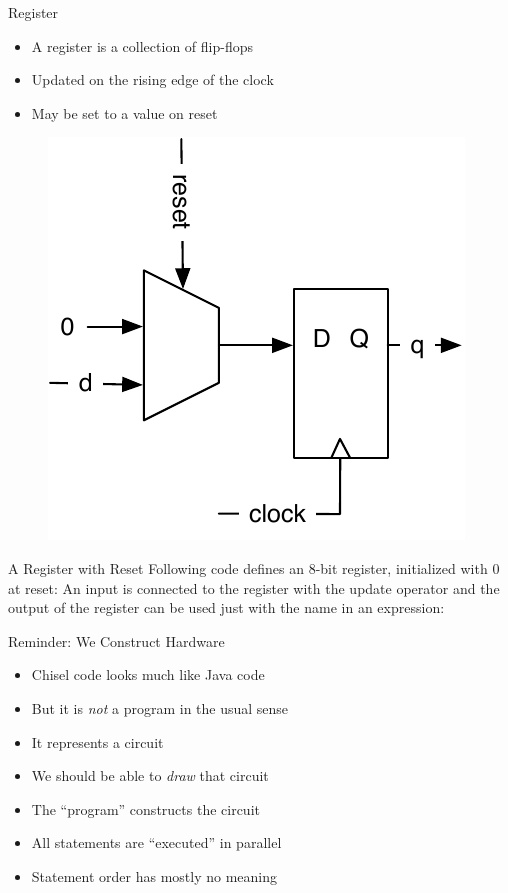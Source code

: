\begin{frame}[fragile]{Register}
\begin{itemize}
\item A register is a collection of flip-flops
\item Updated on the rising edge of the clock
\item May be set to a value on reset
\end{itemize}
\begin{figure}
  \includegraphics[scale=\scale]{../figures/register-reset-0}
\end{figure}
\end{frame}

\begin{frame}[fragile]{A Register with Reset}
Following code defines an 8-bit register, initialized with 0 at reset:
\noindent An input is connected to the register with the \code{:=} update operator and
the output of the register can be used just with the name in an expression:
\end{frame}

\begin{frame}[fragile]{Reminder: We Construct Hardware}
\begin{itemize}
\item Chisel code looks much like Java code
\item But it is \emph{not} a program in the usual sense
\item It represents a circuit
\item We should be able to \emph{draw} that circuit
\item The ``program'' constructs the circuit
\item All statements are ``executed'' in parallel
\item Statement order has mostly no meaning
\end{itemize}
\end{frame}

